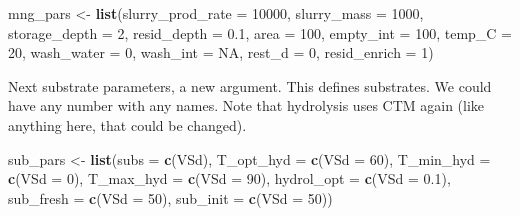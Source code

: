 \documentclass[
]{article}
\newenvironment{Shaded}{\begin{snugshade}}{\end{snugshade}}
\newcommand{\AttributeTok}[1]{\textcolor[rgb]{0.13,0.29,0.53}{#1}}
\newcommand{\ConstantTok}[1]{\textcolor[rgb]{0.56,0.35,0.01}{#1}}
\newcommand{\DecValTok}[1]{\textcolor[rgb]{0.00,0.00,0.81}{#1}}
\newcommand{\FloatTok}[1]{\textcolor[rgb]{0.00,0.00,0.81}{#1}}
\newcommand{\FunctionTok}[1]{\textcolor[rgb]{0.13,0.29,0.53}{\textbf{#1}}}
\newcommand{\NormalTok}[1]{#1}
\newcommand{\OtherTok}[1]{\textcolor[rgb]{0.56,0.35,0.01}{#1}}
\newcommand{\StringTok}[1]{\textcolor[rgb]{0.31,0.60,0.02}{#1}}
\begin{document}
\begin{Shaded}
\begin{Highlighting}[]
\NormalTok{mng\_pars }\OtherTok{\textless{}{-}} \FunctionTok{list}\NormalTok{(}\AttributeTok{slurry\_prod\_rate =} \DecValTok{10000}\NormalTok{, }
                 \AttributeTok{slurry\_mass =} \DecValTok{1000}\NormalTok{,     }
                 \AttributeTok{storage\_depth =} \DecValTok{2}\NormalTok{,     }
                 \AttributeTok{resid\_depth =} \FloatTok{0.1}\NormalTok{,      }
                 \AttributeTok{area =} \DecValTok{100}\NormalTok{,              }
                 \AttributeTok{empty\_int =} \DecValTok{100}\NormalTok{,          }
                 \AttributeTok{temp\_C =} \DecValTok{20}\NormalTok{,}
                 \AttributeTok{wash\_water =} \DecValTok{0}\NormalTok{,            }
                 \AttributeTok{wash\_int =} \ConstantTok{NA}\NormalTok{,}
                 \AttributeTok{rest\_d =} \DecValTok{0}\NormalTok{,}
                 \AttributeTok{resid\_enrich =} \DecValTok{1}\NormalTok{)}
\end{Highlighting}
\end{Shaded}

Next substrate parameters, a new argument. This defines substrates. We
could have any number with any names. Note that hydrolysis uses CTM
again (like anything here, that could be changed).

\begin{Shaded}
\begin{Highlighting}[]
\NormalTok{sub\_pars }\OtherTok{\textless{}{-}} \FunctionTok{list}\NormalTok{(}\AttributeTok{subs =} \FunctionTok{c}\NormalTok{(}\StringTok{\textquotesingle{}VSd\textquotesingle{}}\NormalTok{),}
                 \AttributeTok{T\_opt\_hyd =} \FunctionTok{c}\NormalTok{(}\AttributeTok{VSd =} \DecValTok{60}\NormalTok{),}
                 \AttributeTok{T\_min\_hyd =} \FunctionTok{c}\NormalTok{(}\AttributeTok{VSd =} \DecValTok{0}\NormalTok{),}
                 \AttributeTok{T\_max\_hyd =} \FunctionTok{c}\NormalTok{(}\AttributeTok{VSd =} \DecValTok{90}\NormalTok{),}
                 \AttributeTok{hydrol\_opt =} \FunctionTok{c}\NormalTok{(}\AttributeTok{VSd =} \FloatTok{0.1}\NormalTok{),}
                 \AttributeTok{sub\_fresh =} \FunctionTok{c}\NormalTok{(}\AttributeTok{VSd =} \DecValTok{50}\NormalTok{),}
                 \AttributeTok{sub\_init =} \FunctionTok{c}\NormalTok{(}\AttributeTok{VSd =} \DecValTok{50}\NormalTok{))}
\end{Highlighting}
\end{Shaded}
\end{document}
